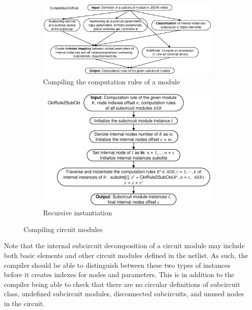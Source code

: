 \begin{figure}[htpb]
\centering
\begin{subfigure}{0.59\textwidth}
	\includegraphics[width = \textwidth]{fig/compile-subckt-rule.pdf}
	\caption{Compiling the computation rules of a module}
	\label{fig:compile-subckt-rule}
\end{subfigure}
\begin{subfigure}{0.35\textwidth}
	\includegraphics[width = \textwidth]{fig/cktrule-to-subckt.pdf}
	\caption{Recursive instantiation}
	\label{fig:cktrule-to-subckt}
\end{subfigure}
\caption{Compiling circuit modules}
\label{fig:subckt-module-compilation}
\end{figure}
Note that the internal subcircuit decomposition of a circuit module may include both basic elements and other circuit modules defined in the netlist. As such, the compiler should be able to distinguish between these two types of instances before it creates indexes for nodes and parameters. This is in addition to the compiler being able to check that there are no circular definitions of subcircuit class, undefined subcircuit modules, disconnected subcircuits, and unused nodes in the circuit.
